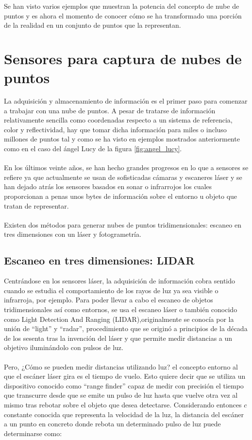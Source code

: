 Se han visto varios ejemplos que muestran la potencia del concepto de nube de puntos y es ahora el momento de conocer cómo se ha transformado una porción de la realidad en un conjunto de puntos que la representan.
\section{Sensores para captura de nubes de puntos}
La adquisición y almacenamiento de información es el primer paso para comenzar a trabajar con una nube de puntos. A pesar de tratarse de información relativamente sencilla como coordenadas respecto a un sistema de referencia, color y reflectividad, hay que tomar dicha información para miles o incluso millones de puntos tal y como se ha visto en ejemplos mostrados anteriormente como en el caso del ángel Lucy de la figura \ref{fig:angel_lucy}. 
\\
\\
En los últimos veinte años, se han hecho grandes progresos en lo que a sensores se refiere ya que actualmente se usan de sofisticadas cámaras y escaneres láser y se han dejado atrás los sensores basados en sonar o infrarrojos los cuales proporcionan a penas unos bytes de información sobre el entorno u objeto que tratan de representar.
\\
\\
Existen dos métodos para generar nubes de puntos tridimensionales: escaneo en tres dimensiones con un láser y fotogrametría.

\subsection{Escaneo en tres dimensiones: LIDAR}
Centrándose en los sensores láser, la adquisición de información cobra sentido cuando se estudia el comportamiento de los rayos de luz ya sea visible o infrarroja, por ejemplo. Para poder llevar a cabo el escaneo de objetos tridimensionales así como entornos, se usa el escaneo láser o también conocido como Light Detection And Ranging (LIDAR)\cite{lidar},originalmente se conocía por la unión de ``light'' y ``radar'', 
procedimiento que se originó a principios de la década de los sesenta tras la invención del láser y que permite medir distancias a un objetivo iluminándolo con pulsos de luz.
\\
\\
Pero, ¿Cómo se pueden medir distancias utilizando luz? el concepto entorno al que el escáner láser gira es el tiempo de vuelo. Esto quiere decir que se utiliza un dispositivo conocido como ``range finder'' capaz de medir con precisión el tiempo que transcurre desde que se emite un pulso de luz hasta que vuelve otra vez al mismo tras rebotar sobre el objeto que desea detectarse. Considerando entonces $c$ constante conocida que representa la velocidad de la luz, la distancia del escáner a un punto en concreto donde rebota un determinado pulso de luz puede determinarse como:

